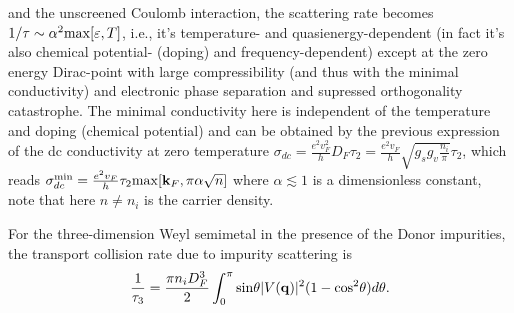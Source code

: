 \documentclass[UTF8,a4paper]{article}
\begin{document}
\begin{large}
and the unscreened Coulomb interaction, 
the scattering rate becomes $1/\tau\sim \alpha^{2}{\rm max}[\varepsilon,T]$\cite{Burkov A A},
i.e., it's temperature- and quasienergy-dependent (in fact it's also chemical potential- (doping) and frequency-dependent)
except at the zero energy Dirac-point with large compressibility (and thus with the minimal conductivity) and electronic phase separation\cite{Guinea F} 
and supressed orthogonality catastrophe\cite{Hentschel M}.
The minimal conductivity here is independent of the temperature and doping (chemical potential)\cite{Stauber T}
and can be obtained by the previous expression of the dc conductivity at zero temperature $\sigma_{dc}=\frac{e^{2}v_{F}^{2}}{h}D_{F}\tau_{2}=
\frac{e^{2}v_{F}}{h}\sqrt{g_{s}g_{v}\frac{n_{i}}{\pi}}\tau_{2}$,
which reads $\sigma_{dc}^{{\rm min}}=\frac{e^{2}v_{F}}{h}\tau_{2}{\rm max}[{\bf k}_{F},\pi\alpha\sqrt{n}]$
where $\alpha \lesssim 1$ is a dimensionless constant,
note that here $n\neq n_{i}$ is the carrier density.

For the three-dimension Weyl semimetal in the presence of the Donor impurities, the transport collision rate due to impurity scattering is
\begin{equation} 
\begin{aligned}
\frac{1}{\tau_{3}}
=\frac{\pi n_{i}D_{F}^{3}}{2}\int^{\pi}_{0} {\rm sin}\theta |V({\bf q})|^{2}(1-{\rm cos}^{2}\theta)d\theta.
\end{aligned}
\end{equation}


\end{large}
\end{document}
